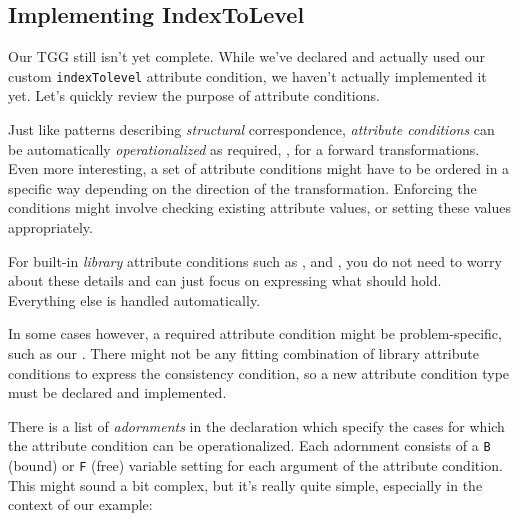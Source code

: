 \hypertarget{subsec:IndexToLevel}{}
\subsection{Implementing IndexToLevel}
\genHeader

Our TGG still isn't yet complete. 
While we've declared and actually used our custom \texttt{indexTolevel} attribute condition, we haven't actually implemented it yet. 
Let's quickly review the purpose of attribute conditions.

Just like patterns describing \emph{structural} correspondence, \emph{attribute conditions} can be automatically \emph{operationalized} as required, \eg, for a forward transformations. 
Even more interesting, a set of attribute conditions might have to be ordered in a specific way depending on the direction of the transformation.
Enforcing the conditions might involve checking existing attribute values, or setting these values appropriately.

For built-in \emph{library} attribute conditions such as ,  and , you do not need to worry about these details and can just focus
on expressing what should hold. 
Everything else is handled automatically.

In some cases however, a required attribute condition might be problem-specific, such as our . 
There might not be any fitting combination of library attribute conditions to express the consistency condition, so a new attribute condition type must be declared and implemented.

There is a list of \emph{adornments} in the declaration which specify the cases for which the attribute condition can be operationalized. 
Each adornment consists of a \texttt{B} (bound) or \texttt{F} (free) variable setting for each argument of the attribute condition. 
This might sound a bit complex, but it's really quite simple, especially in the context of our example:

